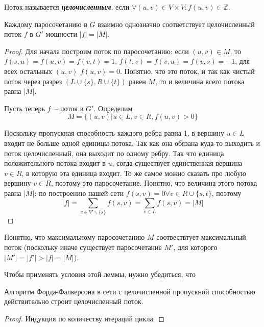 \begin{definition}
	Поток называется {\it\bf целочисленным}, если $\forall (u,v)\in V\times V\colon f(u,v)\in\mathbb{Z}$.
\end{definition}
\begin{lemma}
	Каждому паросочетанию в $G$ взаимно однозначно соответствует целочисленный поток $f$ в $G'$ мощности $|f|=|M|$.
\end{lemma}
\begin{proof}
	Для начала построим поток по паросочетанию: если $(u,v)\in M$, то $f(s,u)=f(u,v)=f(v,t)=1$, $f(t,v)=f(v,u)=f(v,s)=-1$, для всех остальных $(u,v)$ $f(u,v)=0$. Понятно, что это поток, и так как чистый поток через разрез $(L\cup\{s\},R\cup\{t\})$ равен $M$, то и величина всего потока равна $|M|$.

	Пусть теперь $f$~-- поток в $G'$. Определим $$M=\{(u,v)|u\in L, v\in R, f(u,v)>0\}$$

	Поскольку пропускная способность каждого ребра равна 1, в вершину $u\in L$ входит не больше одной единицы потока. Так как она обязана куда-то выходить и поток целочисленный, она выходит по одному ребру. Так что единица положительного потока входит в $u$, согда существует единственная вершина $v\in R$, в которую эта единица входит. То же самое можно сказать про любую вершину $v\in R$, поэтому это паросочетание. Понятно, что величина этого потока равна $|M|$: по построению нашей сети $f(s,v)=0 \forall v\in R\cup\{s,t\}$, поэтому $$|f|=\sum_{v\in V'\smallsetminus\{s\}}f(s,v)=\sum_{v\in L}f(s,v)=|M|$$
\end{proof}

Понятно, что максимальному паросочетанию $M$ соотвествтует максимальный поток (поскольку иначе существует паросочетание $M'$, для которого $|M'|=|f'|>|f|=|M|$).

Чтобы применять условия этой леммы, нужно убедиться, что
\begin{lemma}
	Алгоритм Форда-Фалкерсона в сети с целочисленной пропускной способностью действительно строит целочисленный поток.
\end{lemma}
\begin{proof}
	Индукция по количеству итераций цикла.
\end{proof}
